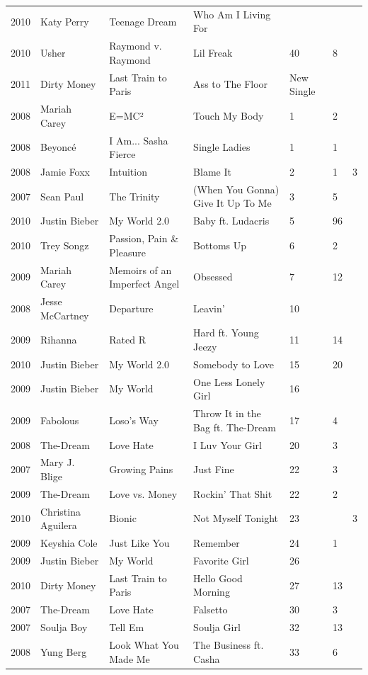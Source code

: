 \documentclass{article}
\begin{document}
\begin{tabular}{lllllll}
2010 & Katy Perry & Teenage Dream & Who Am I Living For &  &  &  \\
2010 & Usher & Raymond v. Raymond & Lil Freak & 40 & 8 &  \\
2011 & Dirty Money & Last Train to Paris & Ass to The Floor & New Single &  &  \\
2008 & Mariah Carey & E=MC² & Touch My Body & 1 & 2 &  \\
2008 & Beyoncé & I Am... Sasha Fierce & Single Ladies & 1 & 1 &  \\
2008 & Jamie Foxx & Intuition & Blame It & 2 & 1 & 3 \\
2007 & Sean Paul & The Trinity & (When You Gonna) Give It Up To Me & 3 & 5 &  \\
2010 & Justin Bieber & My World 2.0 & Baby ft. Ludacris & 5 & 96 &  \\
2010 & Trey Songz & Passion, Pain \& Pleasure & Bottoms Up & 6 & 2 &  \\
2009 & Mariah Carey & Memoirs of an Imperfect Angel & Obsessed & 7 & 12 &  \\
2008 & Jesse McCartney & Departure & Leavin' & 10 &  &  \\
2009 & Rihanna & Rated R & Hard ft. Young Jeezy & 11 & 14 &  \\
2010 & Justin Bieber & My World 2.0 & Somebody to Love & 15 & 20 &  \\
2009 & Justin Bieber & My World & One Less Lonely Girl & 16 &  &  \\
2009 & Fabolous & Loso's Way & Throw It in the Bag ft. The-Dream & 17 & 4 &  \\
2008 & The-Dream & Love Hate & I Luv Your Girl & 20 & 3 &  \\
2007 & Mary J. Blige & Growing Pains & Just Fine & 22 & 3 &  \\
2009 & The-Dream & Love vs. Money & Rockin' That Shit & 22 & 2 &  \\
2010 & Christina Aguilera & Bionic & Not Myself Tonight & 23 &  & 3 \\
2009 & Keyshia Cole & Just Like You & Remember & 24 & 1 &  \\
2009 & Justin Bieber & My World & Favorite Girl & 26 &  &  \\
2010 & Dirty Money & Last Train to Paris & Hello Good Morning & 27 & 13 &  \\
2007 & The-Dream & Love Hate & Falsetto & 30 & 3 &  \\
2007 & Soulja Boy & Tell Em & Soulja Girl & 32 & 13 &  \\
2008 & Yung Berg & Look What You Made Me & The Business ft. Casha & 33 & 6 &  \\

\end{tabular}
\end{document}

